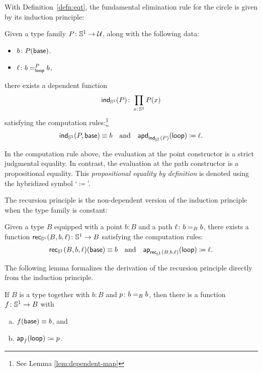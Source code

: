 With Definition~\ref{defn:eqt}, the fundamental elimination rule for the circle is given by its induction principle:

\begin{description}[font=\normalfont\scshape]
    \item[Induction:] 
    Given a type family $P\colon\sphere^1\to\univ$, along with the following data:
    \begin{itemize}
        \item $b\colon P(\fun{base})$.
        \item $\ell\colon b\eqt{\fun{loop}}Pb$,
    \end{itemize}
    there exists a dependent function
    \[
        \fun{ind}_{\sphere^1}(P)\colon
            \prod_{x\colon\sphere^1}P(x)
    \]satisfying the computation rules:\footnote{See Lemma \ref{lem:dependent-map}}
    \[
        \mathsf{ind}_{\mathbb S^1}(P,\mathsf{base})\equiv b
        \quad\text{and}\quad
        \mathsf{apd}_{\mathsf{ind}_{\mathbb S^1}(P)}(\mathsf{loop})\coloneqq\ell.
    \]
\end{description}

\begin{rem}
    In the computation rule above, the evaluation at the point constructor is a strict judgmental equality. In contrast, the evaluation at the path constructor is a propositional equality. This \textsl{propositional equality by definition} is denoted using the hybridized symbol `$\coloneqq$'.
\end{rem}

The recursion principle is the non-dependent version of the induction principle when the type family is constant:

\begin{description}[font=\normalfont\scshape]
    \item[Recursion:] 
    Given a type $B$ equipped with a point $b\colon B$ and a path $\ell\colon b\eq Bb$, there exists a function $\fun{rec}_{\sphere^1}(B,b,\ell)\colon\sphere^1\to B$ satisfying the computation rules:
    \[
        \mathsf{rec}_{\mathbb S^1}(B,b,\ell)(\mathsf{base})\equiv b
        \quad\text{and}\quad
        \mathsf{ap}_{\mathsf{rec}_{\mathbb S^1}(B,b,\ell)}(\mathsf{loop})\coloneqq\ell.
    \] 
\end{description}

The following lemma formalizes the derivation of the recursion principle directly from the induction principle.

\begin{lem}\label{lem:S^1-rec-from-ind}
    If\/ $B$ is a type together with\/ $b\colon B$ and\/ $p\colon b\eq Bb$, then there is a function\/ $f\colon\sphere^1\to B$ with
    \begin{enumerate}[a),font=\upshape]
        \item $f(\mathsf{base})\equiv b$, and
        \item $\mathsf{ap}_f(\mathsf{loop})\coloneqq p$.
    \end{enumerate}
\end{lem}

